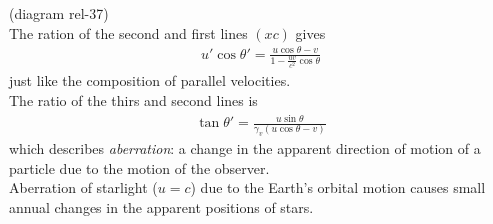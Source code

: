 \documentclass[a4paper]{article}
\begin{document}
(diagram rel-37)\\
The ration of the second and first lines $\left(x c\right)$ gives
\begin{equation*}
\begin{aligned}
u'\cos\theta' = \frac{u\cos\theta - v}{1-\frac{uv}{c^2}\cos\theta}
\end{aligned}
\end{equation*}
just like the composition of parallel velocities.\\
The ratio of the thirs and second lines is
\begin{equation*}
\begin{aligned}
\tan \theta' = \frac{u\sin \theta}{\gamma_v \left(u\cos\theta - v\right)}
\end{aligned}
\end{equation*}
which describes \emph{aberration}: a change in the apparent direction of motion of a particle due to the motion of the observer.\\
Aberration of starlight ($u=c$) due to the Earth's orbital motion causes small annual changes in the apparent positions of stars.
\end{document}
